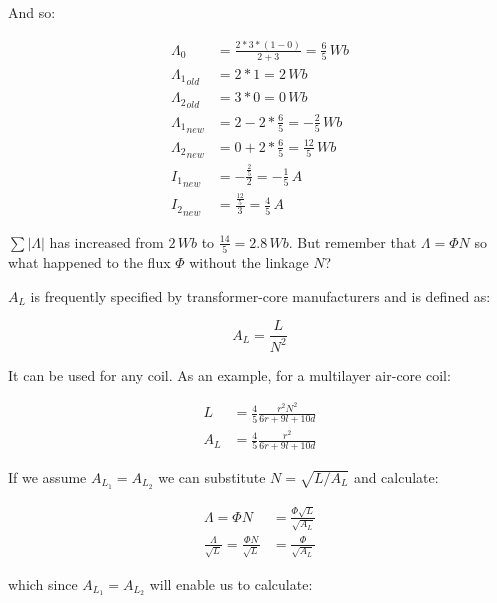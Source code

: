 \documentclass[]{elementary-physics}
\begin{document}
And so:

\begin{subequations}
\begin{align}
\Lambda_0 &= \frac{2 * 3 * (1-0)}{2 + 3} = \frac{6}{5} \, Wb \\
{\Lambda_1}_{old} &= 2 * 1 = 2 \, Wb \\
{\Lambda_2}_{old} &= 3 * 0 = 0 \, Wb \\
{\Lambda_1}_{new} &= 2 -2 * \frac{6}{5} = -\frac{2}{5} \, Wb \\
{\Lambda_2}_{new} &= 0 +2 * \frac{6}{5} = \frac{12}{5} \, Wb \\
{I_1}_{new} &= -\frac{\frac{2}{5}}{2} = -\frac{1}{5} \, A \\
{I_2}_{new} &= \frac{\frac{12}{5}}{3} = \frac{4}{5} \, A
\end{align}
\end{subequations}

$\sum |\Lambda|$ has increased from $2 \, Wb$ to $\frac{14}{5} = 2.8 \, Wb$.
But remember that $\Lambda = \Phi N$ so what happened to the flux $\Phi$ without the linkage $N$?

$A_L$ is frequently specified by transformer-core manufacturers and is defined as:

\begin{equation}
A_L = \frac{L}{N^2}
\end{equation}

It can be used for any coil.
As an example, for a multilayer air-core coil\cite{wpind}:

\begin{subequations}
\begin{align}
L &= \frac{4}{5} \frac{r^2 N^2}{6r+9l+10d} \\
A_L &= \frac{4}{5} \frac{r^2}{6r+9l+10d}
\end{align}
\end{subequations}

If we assume $A_{L_1} = A_{L_2}$ we can substitute $N = \sqrt{L/A_L}$ and calculate:

\begin{subequations}
\begin{align}
\Lambda = \Phi N &= \frac{\Phi \sqrt{L}}{\sqrt{A_L}} \\
\frac{\Lambda}{\sqrt{L}} = \frac{\Phi N}{\sqrt{L}} &= \frac{\Phi}{\sqrt{A_L}}
\end{align}
\end{subequations}

which since $A_{L_1} = A_{L_2}$ will enable us to calculate:
\end{document}
